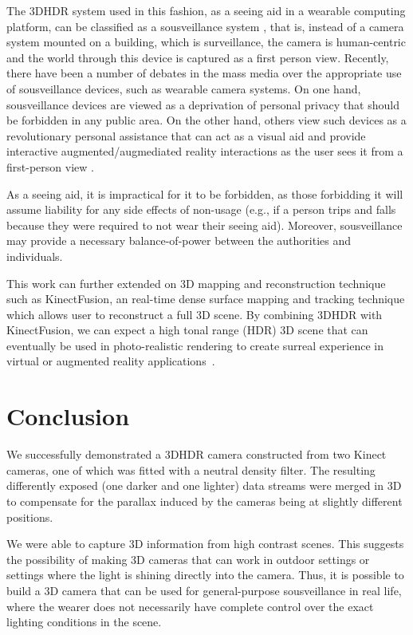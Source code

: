 The 3DHDR system used in this fashion, as a seeing aid in a wearable computing platform, can be classified as a sousveillance system \cite{mann2004sousveillance,mann2006cyborglogging,mann2002sousveillance}, that is, instead of a camera system mounted on a building, which is surveillance, the camera is
human-centric and the world through this device is captured as a first person
view. Recently, there have been
a number of debates in the mass media over the appropriate use of sousveillance
devices, such as wearable camera systems. On one hand, sousveillance devices are viewed as
a deprivation of personal privacy that should be forbidden in any public area.
On the other hand, others view such devices as a revolutionary personal
assistance that can act as a visual aid and provide interactive
augmented/augmediated reality interactions \cite{hill2004reality} as the user sees it from a first-person view \cite{aimone2003eyetap}.

As a seeing aid, it is impractical for it to be forbidden, as those forbidding
it will assume liability for any side effects of non-usage (e.g., if a person
trips and falls because they were required to not wear their seeing aid).
Moreover, sousveillance may provide a necessary
balance-of-power between the authorities and individuals.

This work can further extended on 3D mapping and reconstruction technique such as KinectFusion, an real-time dense surface mapping and tracking technique which allows user to reconstruct a full 3D scene. By combining 3DHDR with KinectFusion, we can expect a high tonal range (HDR) 3D scene that can eventually be used in photo-realistic rendering to create surreal experience in virtual or augmented reality applications~\cite{agusanto2003photorealistic}. 

\section{Conclusion}
We successfully demonstrated a 3DHDR camera constructed from two
Kinect cameras, one of which was fitted with a neutral density filter.
The resulting differently exposed (one darker and one lighter) data streams
were merged in 3D to compensate for the parallax induced by the cameras
being at slightly different positions.

We were able to capture 3D information from high contrast scenes.
This suggests the possibility of making 3D cameras that can work in
outdoor settings or settings where the light is shining directly into
the camera. Thus, it is possible to build a 3D camera that can be used for
general-purpose sousveillance in real life, where the wearer does not
necessarily have complete control over the exact lighting conditions in the scene.


